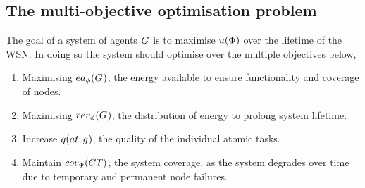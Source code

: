\subsection{The multi-objective optimisation problem}
\label{section:optimisation_problem}

The goal of a system of agents $G_{}^{}$ is to maximise $\functionSystemUtility{}{}$ over the lifetime of the WSN. In doing so the system should optimise over the multiple objectives below, 
\begin{enumerate}
	\item Maximising $\functionEnergyAvailable{}{}$, the energy available to ensure functionality and coverage of nodes.
	\item Maximising $\functionEnergyVariability{}{}$,  the distribution of energy to prolong system lifetime.
	\item Increase $\functionAtomicTaskQualitySignature{}{}$, the quality of the individual atomic tasks.
	\item Maintain $\functionSystemCoverage{}{}$, the system coverage, as the system degrades over time due to temporary and permanent node failures.
\end{enumerate}


